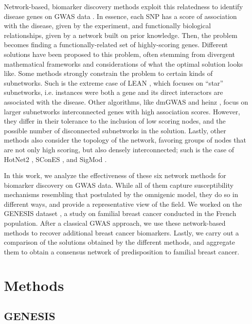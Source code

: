 \documentclass[twocolumn, 11pt]{article}
\begin{document}
Network-based, biomarker discovery methods exploit this relatedness to identify disease genes on GWAS data \cite{azencott_network-guided_2016}. In essence, each SNP has a score of association with the disease, given by the experiment, and functionally biological relationships, given by a network built on prior knowledge. Then, the problem becomes finding a functionally-related set of highly-scoring genes. Different solutions have been proposed to this problem, often stemming from divergent mathematical frameworks and considerations of what the optimal solution looks like. Some methods strongly constrain the problem to certain kinds of subnetworks. Such is the extreme case of LEAN \cite{gwinner_network-based_2016}, which focuses on ``star'' subnetworks, i.e. instances were both a gene and its direct interactors are associated with the disease. Other algorithms, like dmGWAS \cite{jia_dmgwas:_2011} and heinz \cite{dittrich_identifying_2008}, focus on larger subnetworks interconnected genes with high association scores. However, they differ in their tolerance to the inclusion of low scoring nodes, and the possible number of disconnected subnetworks in the solution. Lastly, other methods also consider the topology of the network, favoring groups of nodes that are not only high scoring, but also densely interconnected; such is the case of HotNet2 \cite{leiserson_pan-cancer_2015}, SConES \cite{azencott_efficient_2013}, and SigMod \cite{liu_sigmod:_2017}.

In this work, we analyze the effectiveness of these six network methods for biomarker discovery on GWAS data. While all of them capture susceptibility mechanisms resembling that postulated by the omnigenic model, they do so in different ways, and provide a representative view of the field. We worked on the GENESIS dataset \cite{sinilnikova_genesis:_2016}, a study on familial breast cancer conducted in the French population. After a classical GWAS approach, we use these network-based methods to recover additional breast cancer biomarkers. Lastly, we carry out a comparison of the solutions obtained by the different methods, and aggregate them to obtain a consensus network of predisposition to familial breast cancer. 

\section{Methods}
\subsection{GENESIS}
\end{document}
